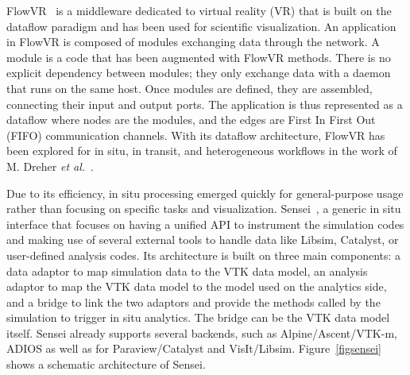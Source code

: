 FlowVR~\cite{allard_flowvr_2004, allard_distributed_2006_flowvr, arcila_flowvr_2006} is a middleware dedicated to virtual reality (VR) that is built on the dataflow\cite{sousa2012dataflow} paradigm and has been used for scientific visualization. 
An application in FlowVR is composed of modules exchanging data through the network. A module is a code that has been augmented with FlowVR methods. There is no explicit dependency between modules; they only exchange data with a daemon that runs on the same host. Once modules are defined, they are assembled, connecting their input and output ports. The application is thus represented as a dataflow where nodes are the modules, and the edges are First In First Out (FIFO) communication channels.
With its dataflow architecture, FlowVR has been explored for in situ, in transit, and heterogeneous workflows in the work of M. Dreher \textit{et al.}~\cite{dreher_methodes_2015, dreher_flexible_2014, dreher_exavis}. 


Due to its efficiency, in situ processing emerged quickly for general-purpose usage rather than focusing on specific tasks and visualization. Sensei~\cite{ayachit_sensei_2016, bethel_sensei_2022, noauthor_sensei_web, git_sensei_2022}, a generic in situ interface that focuses on having a unified API to instrument the simulation codes and making use of several external tools to handle data like Libsim, Catalyst, or user-defined analysis codes. 
Its architecture is built on three main components: a data adaptor to map simulation data to the VTK data model, an analysis adaptor to map the VTK data model to the model used on the analytics side, and a bridge to link the two adaptors and provide the methods called by the simulation to trigger in situ analytics. The bridge can be the VTK data model itself. Sensei already supports several backends, such as Alpine/Ascent/VTK-m\cite{Larsen-alpine-isav17, moreland_vtk-m_2016}, ADIOS\cite{lofstead_insights_2013_adios, boyuka_transparent_2014_adios} as well as for Paraview/Catalyst and VisIt/Libsim. Figure~\ref{figsensei} shows a schematic architecture of Sensei. 

